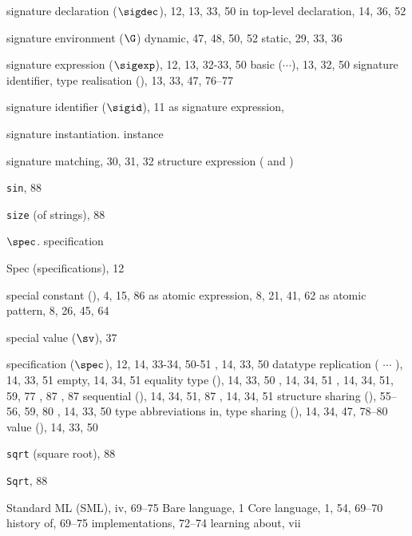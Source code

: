 \begin{theindex}
\item signature declaration ($\sigdec$), 12, 13, 33, 50
\subitem in top-level declaration, 14, 36, 52
\item signature environment ($\G$)
\subitem dynamic, 47, 48, 50, 52
\subitem static, 29, 33, 36
\item signature expression ($\sigexp$), 12, 13, 32-33, 50
\subitem basic ($\cdots$), 13, 32, 50
\subitem signature identifier, \sigidrefs
\subitem type realisation (), 13, 33, 47, 76--77
\item signature identifier ($\sigid$), 11
\subitem as signature expression, \sigidrefs
\item signature instantiation. \see instance
\item signature matching, 30, 31, 32
\subitem \seealso structure expression (\boxml{:} and \boxml{:>})
\item {\tt sin}, 88
\item {\tt size} (of strings), 88
\item $\spec$. \see specification
\item Spec (specifications), 12
\item special constant (\scon), 4, 15, 86
\subitem as atomic expression, 8, 21, 41, 62
\subitem as atomic pattern, 8, 26, 45, 64
\item special value ($\sv$), 37
\item specification ($\spec$), 12, 14, 33-34, 50-51
\subitem {}, 14, 33, 50
\subitem datatype replication ( $\cdots$ \linebreak
{}), 14, 33, 51
\subitem empty, 14, 34, 51
\subitem equality type (), 14, 33, 50
\subitem {}, 14, 34, 51
\subitem {}, 14, 34, 51, 59, 77
\subitem {}, 87
\subitem {}, 87
\subitem sequential (\boxml{;}), 14, 34, 51, 87
\subitem {}, 14, 34, 51
\subitem structure sharing (), 55--56, 59, 80
\subitem {}, 14, 33, 50
\subitem type abbreviations in, \typabbrinsigsrefs
\subitem type sharing (), 14, 34, 47, 78--80
\subitem value (), 14, 33, 50
\item {\tt sqrt} (square root), 88
\item {\tt Sqrt}, 88
\item Standard ML (SML), iv, 69--75
\subitem Bare language, 1
\subitem Core language, 1, 54, 69--70
\subitem history of, 69--75
\subitem implementations, 72--74
\subitem learning about, vii

\end{theindex}
